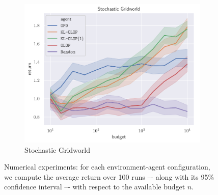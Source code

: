 \begin{figure}[pth]
\begin{subfigure}[b]{0.49\linewidth}
		\includegraphics[width=\textwidth]{img/gw_stoch_return_svg-tex}
		\caption{Stochastic Gridworld}
		\label{sub:gridworld_stoch}
	\end{subfigure}
	\caption{Numerical experiments: for each environment-agent configuration, we compute the average return over 100 runs –- along with its 95\% confidence interval –- with respect to the available budget $n$.}
	\label{fig:experiments}
\end{figure}


